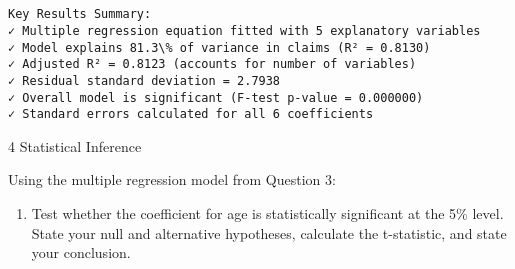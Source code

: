 \documentclass[8pt, twocolumn]{extarticle}
\providecommand{\tightlist}{%
      \setlength{\itemsep}{0pt}\setlength{\parskip}{0pt}}
\begin{document}
    \begin{center}
    \end{center}
    { \hspace*{\fill} \\}
    
    \begin{Verbatim}[commandchars=\\\{\}]

Key Results Summary:
✓ Multiple regression equation fitted with 5 explanatory variables
✓ Model explains 81.3\% of variance in claims (R² = 0.8130)
✓ Adjusted R² = 0.8123 (accounts for number of variables)
✓ Residual standard deviation = 2.7938
✓ Overall model is significant (F-test p-value = 0.000000)
✓ Standard errors calculated for all 6 coefficients
    \end{Verbatim}

    4 Statistical Inference

Using the multiple regression model from Question 3:

    \begin{enumerate}
\def\labelenumi{(\alph{enumi})}
\tightlist
\item
  Test whether the coefficient for age is statistically significant at
  the 5\% level. State your null and alternative hypotheses, calculate
  the t-statistic, and state your conclusion.
\end{enumerate}
\end{document}

